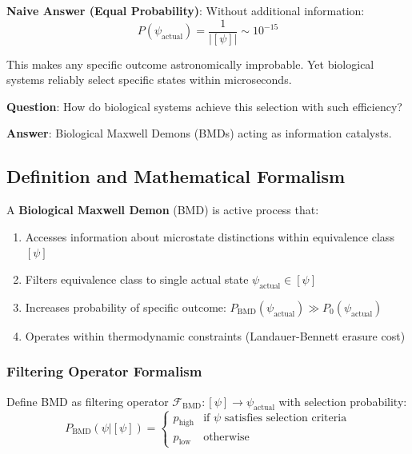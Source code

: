 \documentclass[11pt,onecolumn]{article}
\begin{document}
\textbf{Naive Answer (Equal Probability)}: Without additional information:
\begin{equation}
P(\psi_{\text{actual}}) = \frac{1}{|[\psi]|} \sim 10^{-15}
\end{equation}

This makes any specific outcome astronomically improbable. Yet biological systems reliably select specific states within microseconds.

\textbf{Question}: How do biological systems achieve this selection with such efficiency?

\textbf{Answer}: Biological Maxwell Demons (BMDs) acting as information catalysts.

\subsection{Definition and Mathematical Formalism}

\begin{definition}
\label{def:bmd}
A \textbf{Biological Maxwell Demon} (BMD) is active process that:
\begin{enumerate}
\item Accesses information about microstate distinctions within equivalence class $[\psi]$
\item Filters equivalence class to single actual state $\psi_{\text{actual}} \in [\psi]$  
\item Increases probability of specific outcome: $P_{\text{BMD}}(\psi_{\text{actual}}) \gg P_0(\psi_{\text{actual}})$
\item Operates within thermodynamic constraints (Landauer-Bennett erasure cost)
\end{enumerate}
\end{definition}

\subsubsection{Filtering Operator Formalism}

Define BMD as filtering operator $\mathcal{F}_{\text{BMD}}: [\psi] \to \psi_{\text{actual}}$ with selection probability:
\begin{equation}
P_{\text{BMD}}(\psi | [\psi]) = \begin{cases}
p_{\text{high}} & \text{if } \psi \text{ satisfies selection criteria} \\
p_{\text{low}} & \text{otherwise}
\end{cases}
\end{equation}
\end{document}
